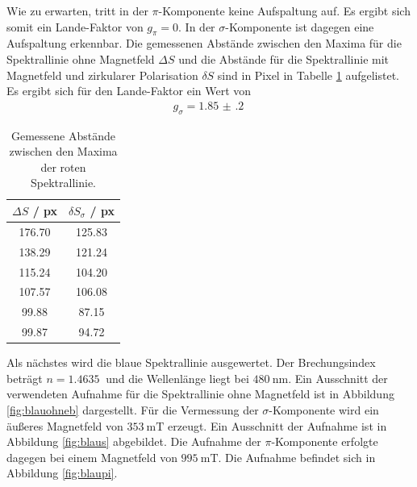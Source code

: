 Wie zu erwarten, tritt in der $\pi$-Komponente keine Aufspaltung auf. Es ergibt sich somit ein Lande-Faktor
von $g_\pi=0$. In der $\sigma$-Komponente ist dagegen eine Aufspaltung erkennbar. Die gemessenen Abstände
zwischen den Maxima für die Spektrallinie ohne Magnetfeld $\Delta S$ und die Abstände für die Spektrallinie mit Magnetfeld
und zirkularer Polarisation $\delta S$ sind in Pixel in Tabelle \ref{tab:rot} aufgelistet.
Es ergibt sich für den Lande-Faktor ein Wert von
\begin{align}
  g_\sigma = \SI{1.85(20)}{}
\end{align}

\begin{table}
  \centering
  \begin{tabular}{c c}
    \toprule
    $\Delta S$ / px & $\delta S_\sigma$ / px\\
    \midrule
        \SI{176.70}{}  &   \SI{125.83}{}\\        
        \SI{138.29}{}  &  \SI{121.24}{}\\
        \SI{115.24}{}  &  \SI{104.20}{}\\
        \SI{107.57}{}  &  \SI{106.08}{}\\
        \SI{99.88}{}  &   \SI{87.15}{}\\
        \SI{99.87}{}  &   \SI{94.72}{}\\
    \bottomrule
  \end{tabular}
  \caption{Gemessene Abstände zwischen den Maxima der roten Spektrallinie.}
  \label{tab:rot}
\end{table}

Als nächstes wird die blaue Spektrallinie ausgewertet. Der Brechungsindex beträgt $n=\SI{1.4635}{}$ und
die Wellenlänge liegt bei $\SI{480}{\nano\metre}$. Ein Ausschnitt der verwendeten Aufnahme für die Spektrallinie
ohne Magnetfeld ist in Abbildung \ref{fig:blauohneb} dargestellt. Für die Vermessung der $\sigma$-Komponente
wird ein äußeres Magnetfeld von $\SI{353}{\milli\tesla}$ erzeugt. Ein Ausschnitt der Aufnahme ist in Abbildung \ref{fig:blaus} abgebildet.
Die Aufnahme der $\pi$-Komponente erfolgte dagegen bei einem Magnetfeld von $\SI{995}{\milli\tesla}$. Die Aufnahme befindet sich in Abbildung \ref{fig:blaupi}.

